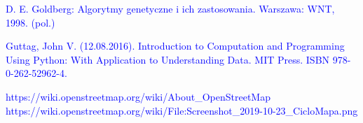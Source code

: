 \documentclass[a4paper, twoside, 12pt, justified]{article}
\begin{document}
\begin{thebibliography}{}
		{\hypertarget{ag}{\textcolor{blue}{
		D. E. Goldberg: Algorytmy genetyczne i ich zastosowania. Warszawa: WNT, 1998. (pol.)}}}
	
		{\hypertarget{python}{\textcolor{blue}{
		 Guttag, John V. (12.08.2016). Introduction to Computation and Programming Using Python: With Application to Understanding Data. MIT Press. ISBN 978-0-262-52962-4.}}}
	 
	 	{\hypertarget{osm}{\textcolor{blue}{
		https://wiki.openstreetmap.org/wiki/About\_OpenStreetMap}}}
		{\hypertarget{osm_example}{\textcolor{blue}{
		https://wiki.openstreetmap.org/wiki/File:Screenshot\_2019-10-23\_CicloMapa.png
		}}}

	\end{thebibliography}
	
	
	
\end{document}
